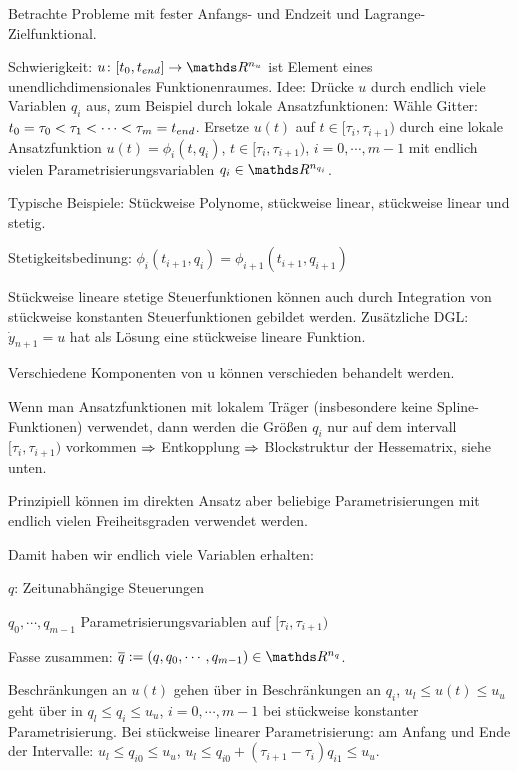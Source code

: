 

Betrachte \obda Probleme mit fester Anfangs- und Endzeit und Lagrange-Zielfunktional.

Schwierigkeit: $u\colon [t_0,\tend] \to \R^{n_u}$ ist Element eines unendlichdimensionales Funktionenraumes. Idee: Drücke $u$ durch endlich viele Variablen $q_i$ aus, zum Beispiel durch lokale Ansatzfunktionen:
Wähle Gitter: $t_0 = \tau_0 < \tau_1 < \cdots < \tau_m = {t_{end}}$. Ersetze $u(t)$ auf $t \in [\tau_i, \tau_{i+1})$ durch eine lokale Ansatzfunktion $u(t) = \phi_i(t,q_i)$, $t \in [\tau_i, \tau_{i+1})$, $i = 0, \cdots, m-1$ mit endlich vielen Parametrisierungsvariablen $q_i \in \R^{n_{q_i}}$.

Typische Beispiele: Stückweise Polynome, stückweise linear, stückweise linear und stetig.

Stetigkeitsbedinung: $\phi_i (t_{i+1}, q_i) = \phi_{i+1} (t_{i+1}, q_{i+1})$


Stückweise lineare stetige Steuerfunktionen können auch durch Integration von stückweise konstanten Steuerfunktionen gebildet werden. Zusätzliche DGL: $\dot y_{n+1} = u$ hat als Lösung eine stückweise lineare Funktion.


\bitm
\item Verschiedene Komponenten von u können verschieden behandelt werden.
\item Wenn man Ansatzfunktionen mit lokalem Träger (insbesondere keine Spline-Funktionen) verwendet, dann werden die Größen $q_i$ nur auf dem intervall $[\tau_i, \tau_{i+1})$ vorkommen $\Rightarrow$ Entkopplung $\Rightarrow$ Blockstruktur der Hessematrix, siehe unten.
\item Prinzipiell können im direkten Ansatz aber beliebige Parametrisierungen mit endlich vielen Freiheitsgraden verwendet werden.
\eitm

Damit haben wir endlich viele Variablen erhalten:

\bitm
\item $q$: Zeitunabhängige Steuerungen
\item $q_0, \cdots, q_{m-1}$ Parametrisierungsvariablen auf $[\tau_i, \tau_{i+1})$
\eitm

Fasse zusammen: $\ov q := (q, q_0, \cdots, q_{m-1}) \in \R^{n_q}$.


Beschränkungen an $u(t)$ gehen über in Beschränkungen an $q_i$, \zB $u_l \leq u(t) \leq u_u$ geht über in $q_l \leq q_i \leq u_u$, $i=0,\cdots,m-1$ bei stückweise konstanter Parametrisierung. Bei stückweise linearer Parametrisierung: am Anfang und Ende der Intervalle: $u_l\leq q_{i0} \leq u_u$, $u_l \leq q_{i0} + (\tau_{i+1} - \tau_i) q_{i1} \leq u_u$.

